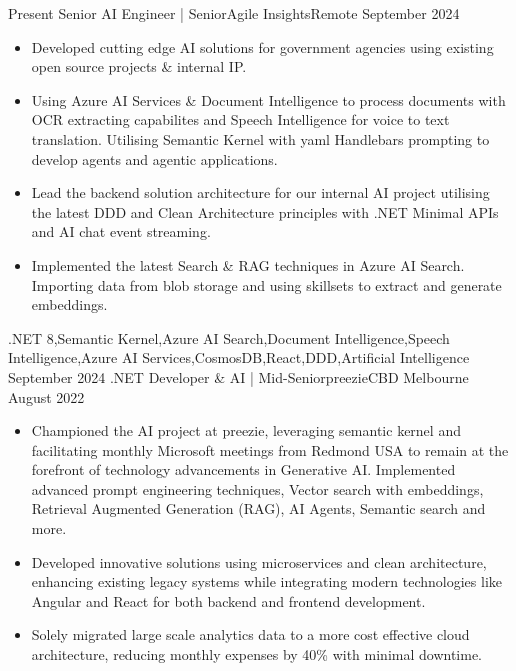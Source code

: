 
\begin{experiences}
    {Present}   {Senior AI Engineer | Senior}{Agile Insights}{Remote}
    {September 2024} {
                      \begin{itemize}
					    \item Developed cutting edge AI solutions for government agencies using existing open source projects \& internal IP.
						\item Using Azure AI Services \& Document Intelligence to process documents with OCR extracting capabilites and Speech Intelligence for voice to text translation. Utilising Semantic Kernel with yaml Handlebars prompting to develop agents and agentic applications.
                        \item Lead the backend solution architecture for our internal AI project utilising the latest DDD and Clean Architecture principles with .NET Minimal APIs and AI chat event streaming.
                        \item Implemented the latest Search \& RAG techniques in Azure AI Search. Importing data from blob storage and using skillsets to extract and generate embeddings.
                      \end{itemize}
                    }
                    {.NET 8,Semantic Kernel,Azure AI Search,Document Intelligence,Speech Intelligence,Azure AI Services,CosmosDB,React,DDD,Artificial Intelligence}
  \emptySeparator
  \experience
    {September 2024}   {.NET Developer \& AI | Mid-Senior}{preezie}{CBD Melbourne}
    {August 2022} {
                      \begin{itemize}
					    \item Championed the AI project at preezie, leveraging semantic kernel and facilitating monthly Microsoft meetings from Redmond USA to remain at the forefront of technology advancements in Generative AI. Implemented advanced prompt engineering techniques, Vector search with embeddings, Retrieval Augmented Generation (RAG), AI Agents, Semantic search and more.
                        \item Developed innovative solutions using microservices and clean architecture, enhancing existing legacy systems while integrating modern technologies like Angular and React for both backend and frontend development.       
                        \item Solely migrated large scale analytics data to a more cost effective cloud architecture, reducing monthly expenses by 40\% with minimal downtime.

\end{itemize}}
\end{experiences}
